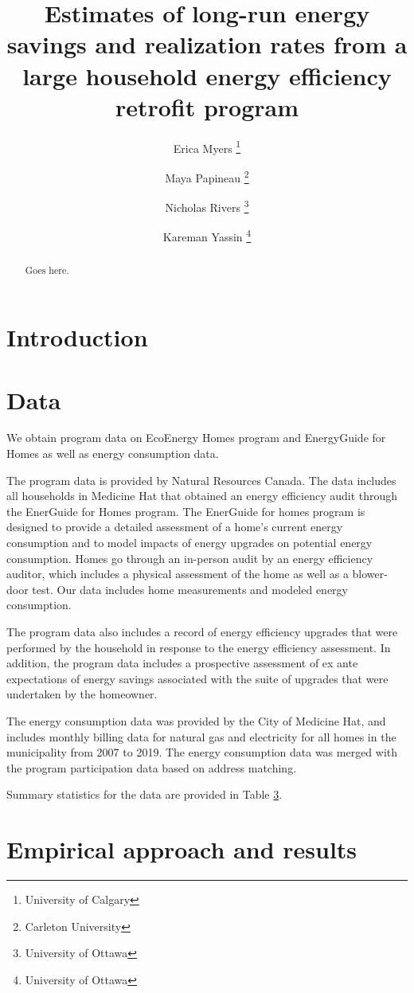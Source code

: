 \documentclass{article}
\author{
    Erica Myers \thanks{University of Calgary}
    \and
    Maya Papineau \thanks{Carleton University}
    \and
    Nicholas Rivers \thanks{University of Ottawa}
    \and 
    Kareman Yassin \thanks{University of Ottawa}
}
\title{
    Estimates of long-run energy savings and realization rates from a large household energy efficiency retrofit program
}
\begin{document}
\maketitle

\begin{abstract}
	Goes here.
\end{abstract}

\section{Introduction}

\section{Data}
We obtain program data on EcoEnergy Homes program and EnergyGuide for Homes as well as energy consumption data.

The program data is provided by Natural Resources Canada. The data includes all households in Medicine Hat that obtained an energy efficiency audit through the EnerGuide for Homes program. The EnerGuide for homes program is designed to provide a detailed assessment of a home's current energy consumption and to model impacts of energy upgrades on potential energy consumption. Homes go through an in-person audit by an energy efficiency auditor, which includes a physical assessment of the home as well as a blower-door test. Our data includes home measurements and modeled energy consumption.

The program data also includes a record of energy efficiency upgrades that were performed by the household in response to the energy efficiency assessment. In addition, the program data includes a prospective assessment of ex ante expectations of energy savings associated with the suite of upgrades that were undertaken by the homeowner.

The energy consumption data was provided by the City of Medicine Hat, and includes monthly billing data for natural gas and electricity for all homes in the municipality from 2007 to 2019.  The energy consumption data was merged with the program participation data based on address matching.

Summary statistics for the data are provided in Table \ref{}. 






\section{Empirical approach and results}
\end{document}
